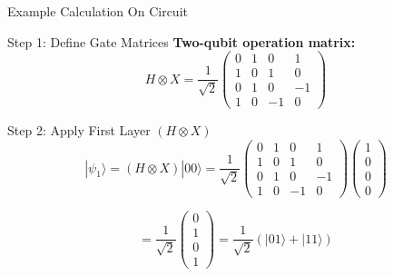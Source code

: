 \documentclass{beamer}
\begin{document}
\begin{frame}{Example Calculation On Circuit}
\begin{block}{Step 1: Define Gate Matrices}
        \textbf{Two-qubit operation matrix:}
        \[
        H \otimes X = \frac{1}{\sqrt{2}} \begin{pmatrix} 
        0 & 1 & 0 & 1 \\ 
        1 & 0 & 1 & 0 \\ 
        0 & 1 & 0 & -1 \\ 
        1 & 0 & -1 & 0 
        \end{pmatrix}
        \]
    \end{block}
    
    \framebreak
    
    \begin{block}{Step 2: Apply First Layer $(H \otimes X)$}
        \[
        |\psi_1\rangle = (H \otimes X)|00\rangle = \frac{1}{\sqrt{2}} \begin{pmatrix} 
        0 & 1 & 0 & 1 \\ 
        1 & 0 & 1 & 0 \\ 
        0 & 1 & 0 & -1 \\ 
        1 & 0 & -1 & 0 
        \end{pmatrix} \begin{pmatrix} 1 \\ 0 \\ 0 \\ 0 \end{pmatrix}
        \]
        
        \[
        = \frac{1}{\sqrt{2}} \begin{pmatrix} 0 \\ 1 \\ 0 \\ 1 \end{pmatrix} = \frac{1}{\sqrt{2}}(|01\rangle + |11\rangle)
        \]
    \end{block}
    
    \framebreak
    

\end{frame}
\end{document}

